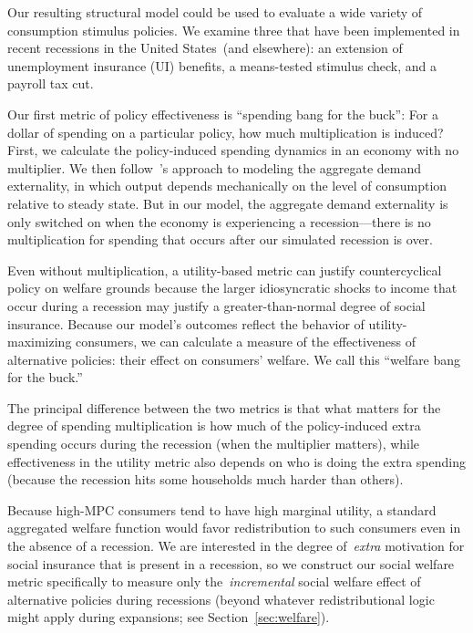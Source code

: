 \documentclass[\latexroot/\projectname]{subfiles}
\begin{document}
Our resulting structural model could be used to evaluate a wide variety of consumption stimulus policies.  We examine three that have been implemented in recent recessions in the United States\ (and elsewhere): an extension of unemployment insurance (UI) benefits, a means-tested stimulus check, and a payroll tax cut.

Our first metric of policy effectiveness is ``spending bang for the buck'': For a dollar of spending on a particular policy, how much multiplication is induced?  %
First, we calculate the policy-induced spending dynamics in an economy with no multiplier.  We then follow~\cite{kmpHandbook}'s approach to modeling the aggregate demand externality, in which output depends mechanically on the level of consumption relative to steady state. But in our model, the aggregate demand externality is only switched on when the economy is experiencing a recession---there is no multiplication for spending that occurs after our simulated recession is over.  %

Even without multiplication, a utility-based metric can justify countercyclical policy on welfare grounds because the larger idiosyncratic shocks to income that occur during a recession may justify a greater-than-normal degree of social insurance.  Because our model's outcomes reflect the behavior of utility-maximizing consumers, we can calculate a measure of the effectiveness of alternative policies:  their effect on consumers' welfare.  We call this ``welfare bang for the buck.''

The principal difference between the two metrics is that what matters for the degree of spending multiplication is how much of the policy-induced extra spending occurs during the recession (when the multiplier matters), while effectiveness in the utility metric also depends on who is doing the extra spending (because the recession hits some households much harder than others).

Because high-MPC consumers tend to have high marginal utility, a standard aggregated welfare function would favor redistribution to such consumers even in the absence of a recession. We are interested in the degree of~\textit{extra} motivation for social insurance that is present in a recession, so we construct our social welfare metric specifically to measure only the~\textit{incremental} social welfare effect of alternative policies during recessions (beyond whatever redistributional logic might apply during expansions; see Section~\ref{sec:welfare}).
\end{document}
